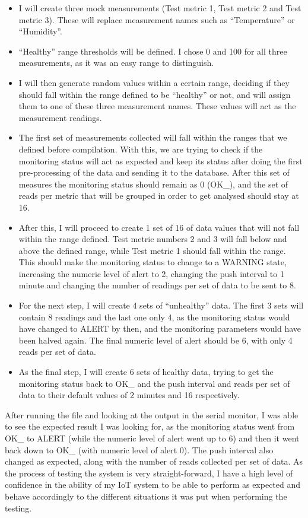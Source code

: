 \documentclass[12pt]{article}
\begin{document}
\begin{itemize}
    \item I will create three mock measurements (Test metric 1, Test metric 2 and Test metric 3). These will replace measurement names such as ``Temperature'' or ``Humidity''. 
    \item ``Healthy'' range thresholds will be defined. I chose 0 and 100 for all three measurements, as it was an easy range to distinguish.
    \item I will then generate random values within a certain range, deciding if they should fall within the range defined to be ``healthy'' or not, and will assign them to one of these three measurement names. These values will act as the measurement readings.
    \item The first set of measurements collected will fall within the ranges that we defined before compilation. With this, we are trying to check if the monitoring status will act as expected and keep its status after doing the first pre-processing of the data and sending it to the database. After this set of measures the monitoring status should remain as 0 (OK\_), and the set of reads per metric that will be grouped in order to get analysed should stay at 16.
    \item After this, I will proceed to create 1 set of 16 of data values that will not fall within the range defined. Test metric numbers 2 and 3 will fall below and above the defined range, while Test metric 1 should fall within the range. This should make the monitoring status to change to a WARNING state, increasing the numeric level of alert to 2, changing the push interval to 1 minute and changing the number of readings per set of data to be sent to 8.
    \item For the next step, I will create 4 sets of ``unhealthy'' data. The first 3 sets will contain 8 readings and the last one only 4, as the monitoring status would have changed to ALERT by then, and the monitoring parameters would have been halved again. The final numeric level of alert should be 6, with only 4 reads per set of data.
    \item As the final step, I will create 6 sets of healthy data, trying to get the monitoring status back to OK\_ and the push interval and reads per set of data to their default values of 2 minutes and 16 respectively.
\end{itemize}

After running the file and looking at the output in the serial monitor, I was able to see the expected result I was looking for, as the monitoring status went from OK\_ to ALERT (while the numeric level of alert went up to 6) and then it went back down to OK\_ (with numeric level of alert 0). The push interval also changed as expected, along with the number of reads collected per set of data. As the process of testing the system is very straight-forward, I have a high level of confidence in the ability of my IoT system to be able to perform as expected and behave accordingly to the different situations it was put when performing the testing.
\end{document}
